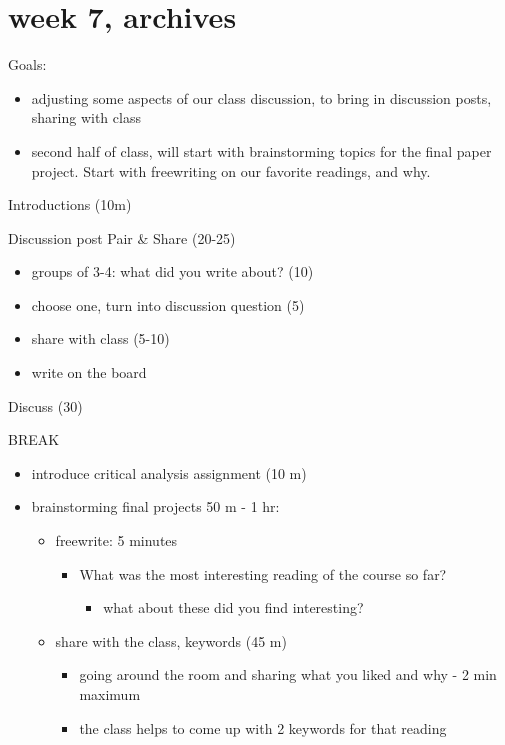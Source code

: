 \documentclass[11pt]{article}
\author{fcalado}
\date{\today}
\title{}
\begin{document}
\tableofcontents

\section{week 7, archives}
\label{sec:org005d554}

Goals:
\begin{itemize}
\item adjusting some aspects of our class discussion, to bring in
discussion posts, sharing with class
\item second half of class, will start with brainstorming topics for the
final paper project. Start with freewriting on our favorite
readings, and why.
\end{itemize}

Introductions (10m)

Discussion post Pair \& Share (20-25)
\begin{itemize}
\item groups of 3-4: what did you write about? (10)
\item choose one, turn into discussion question (5)
\item share with class (5-10)
\item write on the board
\end{itemize}

Discuss (30)

BREAK

\begin{itemize}
\item introduce critical analysis assignment (10 m)

\item brainstorming final projects 50 m - 1 hr: 
\begin{itemize}
\item freewrite: 5 minutes
\begin{itemize}
\item What was the most interesting reading of the course so far? 
\begin{itemize}
\item what about these did you find interesting?
\end{itemize}
\end{itemize}
\item share with the class, keywords (45 m)
\begin{itemize}
\item going around the room and sharing what you liked and why - 2
min maximum
\item the class helps to come up with 2 keywords for that reading
\end{itemize}
\end{itemize}
\end{itemize}
\end{document}
